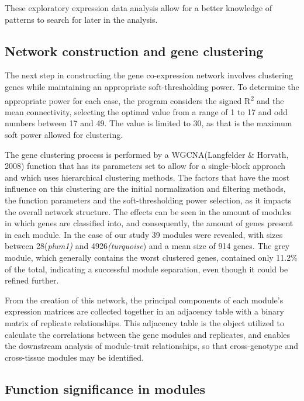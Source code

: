\documentclass[
]{article}
\begin{document}
These exploratory expression data analysis allow for a better knowledge
of patterns to search for later in the analysis.

\hypertarget{network-construction-and-gene-clustering}{%
\subsection{Network construction and gene
clustering}\label{network-construction-and-gene-clustering}}

The next step in constructing the gene co-expression network involves
clustering genes while maintaining an appropriate soft-thresholding
power. To determine the appropriate power for each case, the program
considers the signed R\textsuperscript{2} and the mean connectivity,
selecting the optimal value from a range of 1 to 17 and odd numbers
between 17 and 49. The value is limited to 30, as that is the maximum
soft power allowed for clustering.

The gene clustering process is performed by a WGCNA(Langfelder \&
Horvath, 2008) function that has its parameters set to allow for a
single-block approach and which uses hierarchical clustering methods.
The factors that have the most influence on this clustering are the
initial normalization and filtering methods, the function parameters and
the soft-thresholding power selection, as it impacts the overall network
structure. The effects can be seen in the amount of modules in which
genes are classified into, and consequently, the amount of genes present
in each module. In the case of our study 39 modules were revealed, with
sizes between 28(\emph{plum1)} and 4926\emph{(turquoise}) and a mean
size of 914 genes. The grey module, which generally contains the worst
clustered genes, contained only 11.2\% of the total, indicating a
successful module separation, even though it could be refined further.

From the creation of this network, the principal components of each
module's expression matrices are collected together in an adjacency
table with a binary matrix of replicate relationships. This adjacency
table is the object utilized to calculate the correlations between the
gene modules and replicates, and enables the downstream analysis of
module-trait relationships, so that cross-genotype and cross-tissue
modules may be identified.

\hypertarget{function-significance-in-modules}{%
\subsection{Function significance in
modules}\label{function-significance-in-modules}}
\end{document}
